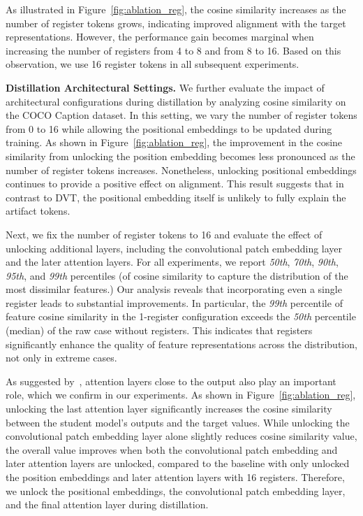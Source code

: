\documentclass{article}
\begin{document}
As illustrated in Figure~\ref{fig:ablation_reg}, the cosine similarity increases as the number of register tokens grows, indicating improved alignment with the target representations. However, the performance gain becomes marginal when increasing the number of registers from 4 to 8 and from 8 to 16. Based on this observation, we use 16 register tokens in all subsequent experiments.

\textbf{Distillation Architectural Settings.} We further evaluate the impact of architectural configurations during distillation by analyzing cosine similarity on the COCO Caption dataset. In this setting, we vary the number of register tokens from 0 to 16 while allowing the positional embeddings to be updated during training. As shown in Figure~\ref{fig:ablation_reg}, the improvement in the cosine similarity from unlocking the position embedding becomes less pronounced as the number of register tokens increases. Nonetheless, unlocking positional embeddings continues to provide a positive effect on alignment. This result suggests that in contrast to DVT, the positional embedding itself is unlikely to fully explain the artifact tokens. 

Next, we fix the number of register tokens to 16 and evaluate the effect of unlocking additional layers, including the convolutional patch embedding layer and the later attention layers. For all experiments, we report \textit{50th}, \textit{70th}, \textit{90th}, \textit{95th}, and \textit{99th} percentiles (of cosine similarity to capture the distribution of the most dissimilar features.) Our analysis reveals that incorporating even a single register leads to substantial improvements. In particular, the \textit{99th} percentile of feature cosine similarity in the 1-register configuration exceeds the \textit{50th} percentile (median) of the raw case without registers. This indicates that registers significantly enhance the quality of feature representations across the distribution, not only in extreme cases.

As suggested by~\citep{wang2024sinder,yang2024denoising}, attention layers close to the output also play an important role, which we confirm in our experiments. As shown in Figure~\ref{fig:ablation_reg}, unlocking the last attention layer significantly increases the cosine similarity between the student model's outputs and the target values. While unlocking the convolutional patch embedding layer alone slightly reduces cosine similarity value, the overall value improves when both the convolutional patch embedding and later attention layers are unlocked, compared to the baseline with only unlocked the position embeddings and later attention layers with 16 registers. Therefore, we unlock the positional embeddings, the convolutional patch embedding layer, and the final attention layer during distillation.
\end{document}
